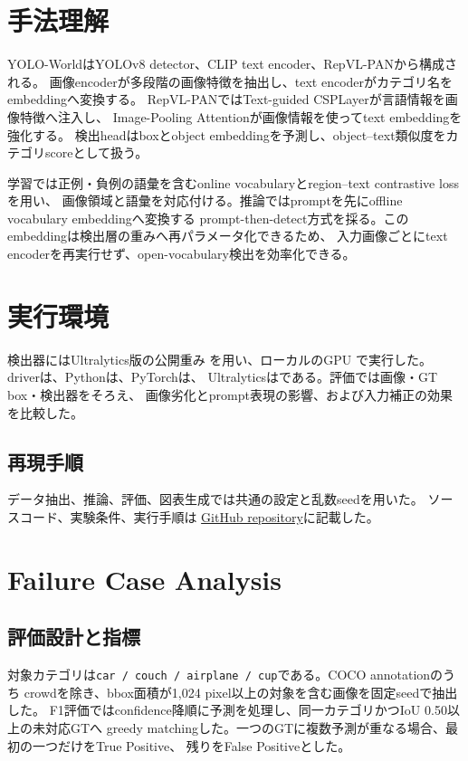 \documentclass[lualatex,ja=standard,a4paper,10pt]{bxjsarticle}
\newcommand{\code}[1]{\texttt{#1}}
\begin{document}
\section{手法理解}

YOLO-WorldはYOLOv8 detector、CLIP text encoder、RepVL-PANから構成される。
画像encoderが多段階の画像特徴を抽出し、text encoderがカテゴリ名をembeddingへ変換する。
RepVL-PANではText-guided CSPLayerが言語情報を画像特徴へ注入し、
Image-Pooling Attentionが画像情報を使ってtext embeddingを強化する。
検出headはboxとobject embeddingを予測し、object--text類似度をカテゴリscoreとして扱う。

学習では正例・負例の語彙を含むonline vocabularyとregion--text contrastive lossを用い、
画像領域と語彙を対応付ける。推論ではpromptを先にoffline vocabulary embeddingへ変換する
prompt-then-detect方式を採る。このembeddingは検出層の重みへ再パラメータ化できるため、
入力画像ごとにtext encoderを再実行せず、open-vocabulary検出を効率化できる。

\section{実行環境}

検出器にはUltralytics版の公開重み
\code{\SameModelName}を用い、ローカルのGPU \GPUName で実行した。
driverは\DriverVersion、Pythonは\PythonVersion、PyTorchは\TorchVersion、
Ultralyticsは\UltralyticsVersion である。評価では画像・GT box・検出器をそろえ、
画像劣化とprompt表現の影響、および入力補正の効果を比較した。

\subsection{再現手順}

データ抽出、推論、評価、図表生成では共通の設定と乱数seedを用いた。
ソースコード、実験条件、実行手順は
\href{https://github.com/fumisugi/visual_media}{GitHub repository}に記載した。

\section{Failure Case Analysis}

\subsection{評価設計と指標}

対象カテゴリは\code{car / couch / airplane / cup}である。COCO annotationのうち
crowdを除き、bbox面積が1,024 pixel以上の対象を含む画像を固定seedで抽出した。
F1評価ではconfidence降順に予測を処理し、同一カテゴリかつIoU 0.50以上の未対応GTへ
greedy matchingした。一つのGTに複数予測が重なる場合、最初の一つだけをTrue Positive、
残りをFalse Positiveとした。
\end{document}
